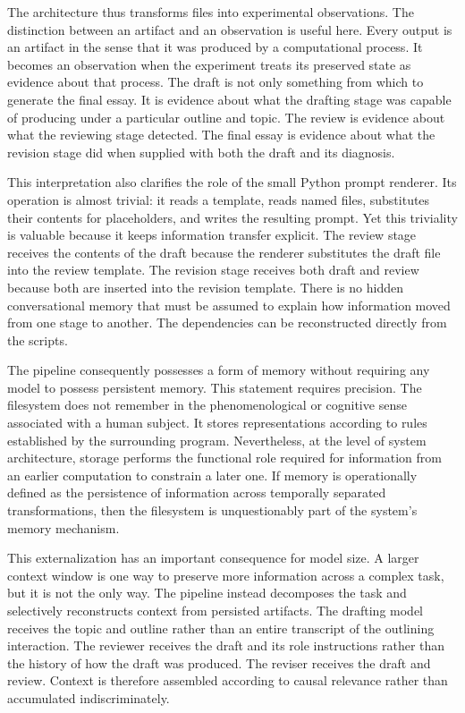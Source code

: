 \documentclass[11pt]{article}
\begin{document}
The architecture thus transforms files into experimental observations. The distinction between an artifact and an observation is useful here. Every output is an artifact in the sense that it was produced by a computational process. It becomes an observation when the experiment treats its preserved state as evidence about that process. The draft is not only something from which to generate the final essay. It is evidence about what the drafting stage was capable of producing under a particular outline and topic. The review is evidence about what the reviewing stage detected. The final essay is evidence about what the revision stage did when supplied with both the draft and its diagnosis.

This interpretation also clarifies the role of the small Python prompt renderer. Its operation is almost trivial: it reads a template, reads named files, substitutes their contents for placeholders, and writes the resulting prompt. Yet this triviality is valuable because it keeps information transfer explicit. The review stage receives the contents of the draft because the renderer substitutes the draft file into the review template. The revision stage receives both draft and review because both are inserted into the revision template. There is no hidden conversational memory that must be assumed to explain how information moved from one stage to another. The dependencies can be reconstructed directly from the scripts.

The pipeline consequently possesses a form of memory without requiring any model to possess persistent memory. This statement requires precision. The filesystem does not remember in the phenomenological or cognitive sense associated with a human subject. It stores representations according to rules established by the surrounding program. Nevertheless, at the level of system architecture, storage performs the functional role required for information from an earlier computation to constrain a later one. If memory is operationally defined as the persistence of information across temporally separated transformations, then the filesystem is unquestionably part of the system's memory mechanism.

This externalization has an important consequence for model size. A larger context window is one way to preserve more information across a complex task, but it is not the only way. The pipeline instead decomposes the task and selectively reconstructs context from persisted artifacts. The drafting model receives the topic and outline rather than an entire transcript of the outlining interaction. The reviewer receives the draft and its role instructions rather than the history of how the draft was produced. The reviser receives the draft and review. Context is therefore assembled according to causal relevance rather than accumulated indiscriminately.
\end{document}
